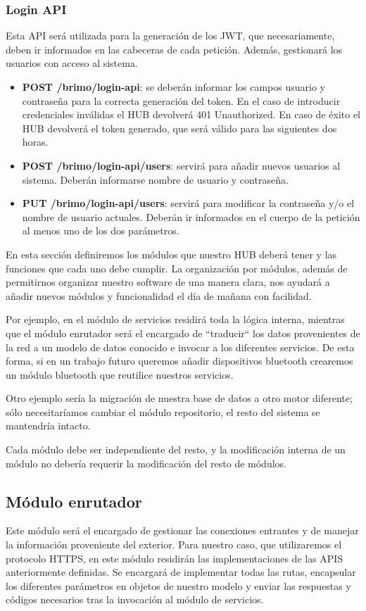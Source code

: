 \subsubsection{Login API}
Esta API será utilizada para la generación de los JWT, que necesariamente, deben ir informados en las cabeceras de cada petición. Además, gestionará
los usuarios con acceso al sistema.
\begin{itemize}
\item \textbf{POST /brimo/login-api}: se deberán informar los campos usuario y contraseña para la correcta generación del token. En el caso
de introducir credenciales inválidas el HUB devolverá 401 Unauthorized. En caso de éxito el HUB devolverá el token generado, que será válido
para las siguientes dos horas.
\item \textbf{POST /brimo/login-api/users}: servirá para añadir nuevos usuarios al sistema. Deberán informarse nombre de usuario y contraseña.
\item \textbf{PUT /brimo/login-api/users}: servirá para modificar la contraseña y/o el nombre de usuario actuales. Deberán ir informados en el
cuerpo de la petición al menos uno de los dos parámetros.
\end{itemize}

En esta sección definiremos los módulos que nuestro HUB deberá tener y las funciones que cada uno debe cumplir. La organización por módulos, además
de permitirnos organizar nuestro software de una manera clara, nos ayudará a añadir nuevos módulos y funcionalidad el día de mañana con facilidad.
\par
Por ejemplo, en el módulo de servicios residirá toda la lógica interna, mientras que el módulo enrutador será el encargado de ``traducir`` los datos
provenientes de la red a un modelo de datos conocido e invocar a los diferentes servicios. De esta forma, si en un trabajo futuro queremos añadir
dispositivos bluetooth crearemos un módulo bluetooth que reutilice nuestros servicios.
\par
Otro ejemplo sería la migración de nuestra base de datos a otro motor diferente; sólo necesitaríamos cambiar el módulo repositorio, el resto del sistema
se mantendría intacto.
\par
Cada módulo
debe ser independiente del resto, y la modificación interna de un módulo no debería requerir la modificación del resto de módulos.
\subsection{Módulo enrutador}
Este módulo será el encargado de gestionar las conexiones entrantes y de manejar la información proveniente del exterior. Para nuestro caso, que utilizaremos
el protocolo HTTPS, en este módulo residirán las implementaciones de las APIS anteriormente definidas. Se encargará de implementar todas las rutas, encapsular
los diferentes parámetros en objetos de nuestro modelo y enviar las respuestas y códigos necesarios tras la invocación al módulo de servicios.
